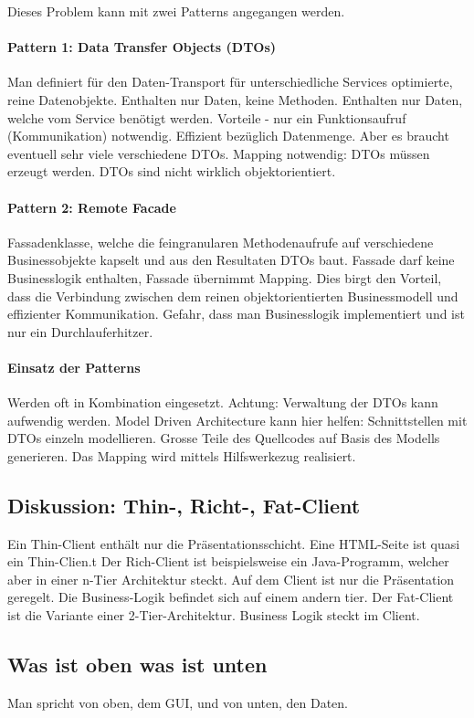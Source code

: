 Dieses Problem kann mit zwei Patterns angegangen werden.

\paragraph{Pattern 1: Data Transfer Objects (DTOs)} Man definiert für den Daten-Transport für unterschiedliche Services optimierte, reine Datenobjekte. Enthalten nur Daten, keine Methoden. Enthalten nur Daten, welche vom Service benötigt werden. Vorteile - nur ein Funktionsaufruf (Kommunikation) notwendig. Effizient bezüglich Datenmenge. Aber es braucht eventuell sehr viele verschiedene DTOs. Mapping notwendig: DTOs müssen erzeugt werden. DTOs sind nicht wirklich objektorientiert.

\paragraph{Pattern 2: Remote Facade} Fassadenklasse, welche die feingranularen Methodenaufrufe auf verschiedene Businessobjekte kapselt und aus den Resultaten DTOs baut. Fassade darf keine Businesslogik enthalten, Fassade übernimmt Mapping. Dies birgt den Vorteil, dass die Verbindung zwischen dem reinen objektorientierten Businessmodell und effizienter Kommunikation. Gefahr, dass man Businesslogik implementiert und ist nur ein Durchlauferhitzer.

\paragraph{Einsatz der Patterns}
Werden oft in Kombination eingesetzt. Achtung: Verwaltung der DTOs kann aufwendig werden. Model Driven Architecture kann hier helfen: Schnittstellen mit DTOs einzeln modellieren. Grosse Teile des Quellcodes auf Basis des Modells generieren. Das Mapping wird mittels Hilfswerkezug realisiert.

\subsection{Diskussion: Thin-, Richt-, Fat-Client}
Ein Thin-Client enthält nur die Präsentationsschicht. Eine HTML-Seite ist quasi ein Thin-Clien.t
Der Rich-Client ist beispielsweise ein Java-Programm, welcher aber in einer n-Tier Architektur steckt. Auf dem Client ist nur die Präsentation geregelt. Die Business-Logik befindet sich auf einem andern tier. Der Fat-Client ist die Variante einer 2-Tier-Architektur. Business Logik steckt im Client.

\subsection{Was ist oben was ist unten}
Man spricht von oben, dem GUI, und von unten, den Daten.
